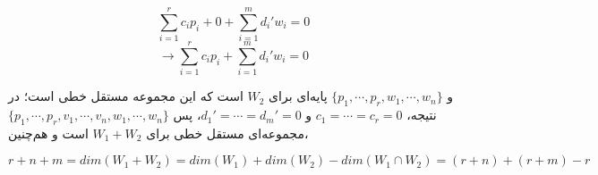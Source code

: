$$ \sum_{i=1}^r c_i p_i + 0 + \sum_{i=1}^m d_i ' w_i  = 0 $$
$$ \to \sum_{i=1}^r c_i p_i + \sum_{i=1}^m d_i ' w_i  = 0 $$

و $\{ p_1,\cdots, p_r, w_1,\cdots, w_n \}$ پایه‌ای برای $W_2$ است که این مجموعه مستقل خطی است؛ در نتیجه، $c_1 = \cdots = c_r = 0$ و $d_1 ' = \cdots = d_m ' = 0$، پس $\{ p_1,\cdots, p_r, v_1,\cdots, v_n, w_1, \cdots, w_n \}$ مجموعه‌ای مستقل خطی برای $W_1 + W_2$ است و هم‌چنین،

$$r + n + m = dim(W_1 + W_2) = dim(W_1) + dim(W_2) - dim(W_1 \cap W_2) = (r+n) + (r+m) - r $$









